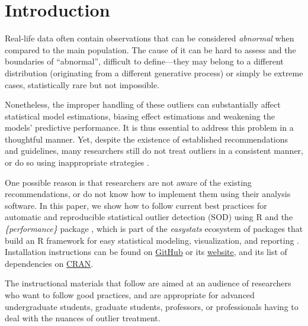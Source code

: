 \documentclass[sn-basic, lineno,pdflatex]{sn-jnl}
\begin{document}



\maketitle

\hypertarget{introduction}{%
\section{Introduction}\label{introduction}}

Real-life data often contain observations that can be considered
\emph{abnormal} when compared to the main population. The cause of it
can be hard to assess and the boundaries of ``abnormal'', difficult to
define---they may belong to a different distribution (originating from a
different generative process) or simply be extreme cases, statistically
rare but not impossible.

Nonetheless, the improper handling of these outliers can substantially
affect statistical model estimations, biasing effect estimations and
weakening the models' predictive performance. It is thus essential to
address this problem in a thoughtful manner. Yet, despite the existence
of established recommendations and guidelines, many researchers still do
not treat outliers in a consistent manner, or do so using inappropriate
strategies \citep{simmons2011false, leys2013outliers}.

One possible reason is that researchers are not aware of the existing
recommendations, or do not know how to implement them using their
analysis software. In this paper, we show how to follow current best
practices for automatic and reproducible statistical outlier detection
(SOD) using R and the \emph{\{performance\}} package
\citep{ludecke2021performance}, which is part of the \emph{easystats}
ecosystem of packages that build an R framework for easy statistical
modeling, visualization, and reporting \citep{easystatspackage}.
Installation instructions can be found on
\href{https://github.com/easystats/performance}{GitHub} or its
\href{https://easystats.github.io/performance/}{website}, and its list
of dependencies on
\href{https://cran.r-project.org/package=performance}{CRAN}.

The instructional materials that follow are aimed at an audience of
researchers who want to follow good practices, and are appropriate for
advanced undergraduate students, graduate students, professors, or
professionals having to deal with the nuances of outlier treatment.
\end{document}
